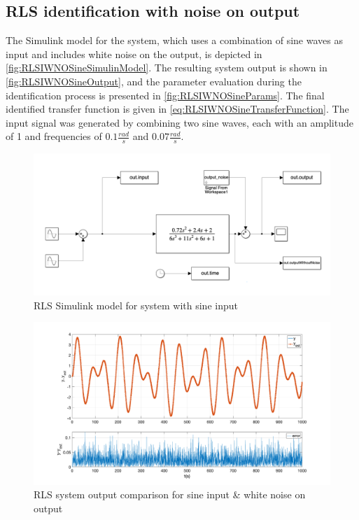 \FloatBarrier
\subsection{RLS identification with noise on output}

The Simulink model for the system, which uses a combination of sine waves as input and includes white noise on the output, is depicted in \autoref{fig:RLSIWNOSineSimulinModel}. The resulting system output is shown in \autoref{fig:RLSIWNOSineOutput}, and the parameter evaluation during the identification process is presented in \autoref{fig:RLSIWNOSineParams}. The final identified transfer function is given in \autoref{eq:RLSIWNOSineTransferFunction}. The input signal was generated by combining two sine waves, each with an amplitude of 1 and frequencies of $0.1 \frac{rad}{s}$ and $0.07 \frac{rad}{s}$.

\begin{figure}
	\centering
	\includegraphics[totalheight=8cm]{images/RLSIWNOSineSimulinkModel.png}
	\caption{RLS Simulink model for system with sine input}
	\label{fig:RLSIWNOSineSimulinModel}
\end{figure}

\begin{figure}
	\centering
	\includegraphics[totalheight=8cm]{images/RLSIWNOSineOutput.png}
	\caption{RLS system output comparison for sine input \& white noise on output}
	\label{fig:RLSIWNOSineOutput}
\end{figure}

